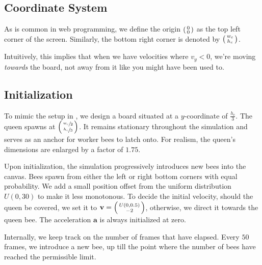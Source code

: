 \documentclass[a4paper,10pt]{article}
\begin{document}
\begin{multicols}{2}
    \subsection{Coordinate System}
    As is common in web programming, we define the origin $\begin{psmallmatrix} 0 \\ 0 \end{psmallmatrix}$
    as the top left corner of the screen. Similarly, the bottom right corner is denoted by
    $\begin{psmallmatrix} w_{c} \\ h_{c} \end{psmallmatrix}$.

    Intuitively, this implies that when we have velocities where $v_{y} < 0$, we're moving
    \textit{towards} the board, not away from it like you might have been used to.

    \subsection{Initialization}
    To mimic the setup in \cite{peleg2018collective}, we design a board situated at
    a $y$-coordinate of $\tfrac{h_{c}}{3}$. The queen spawns at 
    $\begin{psmallmatrix} \sfrac{w_{c}}{2} \\ \sfrac{h_{c}}{3} \end{psmallmatrix}$.
    It remains stationary throughout the simulation and serves as an anchor
    for worker bees to latch onto. For realism, the queen's dimensions are enlarged by
    a factor of $1.75$.

    Upon initialization, the simulation progressively introduces new bees into the
    canvas. Bees spawn from either the left or right bottom corners with equal
    probability. We add a small position offset from the uniform distribution $U(0, 30)$
    to make it less monotonous. To decide the initial velocity, should the queen be
    covered, we set it to $\mathbf{v} = \begin{psmallmatrix} U(0, 0.5) \\ -2 \end{psmallmatrix}$,
    otherwise, we direct it towards the queen bee. The acceleration $\mathbf{a}$ is always
    initialized at zero.

    Internally, we keep track on the number of frames that have elapsed. Every $50$
    frames, we introduce a new bee, up till the point where the number of bees
    have reached the permissible limit.


\end{multicols}
\end{document}
